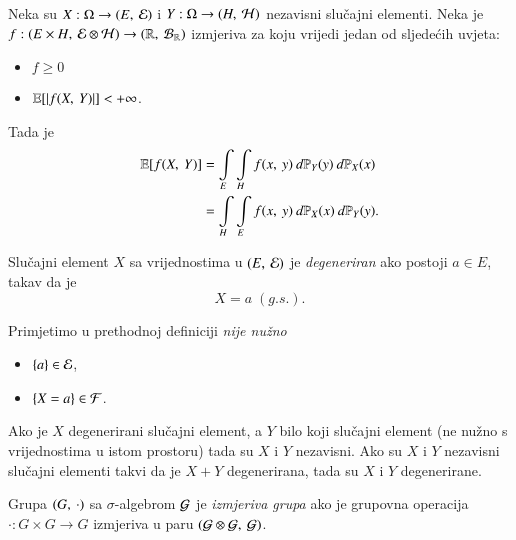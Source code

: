 \begin{zad} \label{zad:7.10}
    Neka su $X : \Omega \to ({E}, \: {\mathcal{E}})$ i $Y : \Omega \to ({H}, \: {\mathcal{H}})$ nezavisni slu\v cajni elementi.
    Neka je $f : ({E \times H}, \: {\mathcal{E} \otimes \mathcal{H}}) \to ({\mathbb{R}}, \: {\mathcal{B}_{\mathbb{R}}})$ izmjeriva za koju vrijedi jedan od sljede\' cih uvjeta:
    \begin{itemize}
        \item $f \geq 0$
        \item $\mathbb{E} [|f ({X}, \: {Y})|] < +\infty$.
    \end{itemize}
    Tada je
    \begin{align*}
        \mathbb{E} [ f ({X}, \: {Y}) ]
        &= \int\limits_{E} \int\limits_{H} f ({x}, \: {y}) \: d \mathbb{P}_Y (y) \: d \mathbb{P}_X (x) \\
        &= \int\limits_H \int\limits_E f ({x}, \: {y}) \: d \mathbb{P}_X (x) \: d \mathbb{P}_Y (y).
    \end{align*}
\end{zad}

\begin{defn}    \label{defn:7.10-1}
    Slu\v cajni element $X$ sa vrijednostima u $({E}, \: {\mathcal{E}})$ je \emph{degeneriran} ako postoji $a \in E$, takav da je
    \begin{equation*}
        X = a \; (g.s.).
    \end{equation*}
\end{defn}

Primjetimo u prethodnoj definiciji \emph{nije nu\v zno}
\begin{itemize}
    \item[] $\{a\} \in \mathcal{E}$,
    \item[] $\{X = a\} \in \mathcal{F}$.
\end{itemize}

\begin{zad} \label{zad:7.11}
    Ako je $X$ degenerirani slu\v cajni element, a $Y$ bilo koji slu\v cajni element (ne nu\v zno s vrijednostima u istom prostoru) tada su $X$ i $Y$ nezavisni.
    Ako su $X$ i $Y$ nezavisni slu\v cajni elementi takvi da je $X + Y$ degenerirana, tada su $X$ i $Y$ degenerirane.
\end{zad}

\begin{defn}    \label{defn:7.11-1}
    Grupa $({G}, \: {\cdot})$ sa $\sigma$-algebrom $\mathcal{G}$ je \emph{izmjeriva grupa} ako je grupovna operacija $\cdot : G \times G \to G$ izmjeriva u paru $({\mathcal{G} \otimes \mathcal{G}}, \: {\mathcal{G}})$.
\end{defn}

